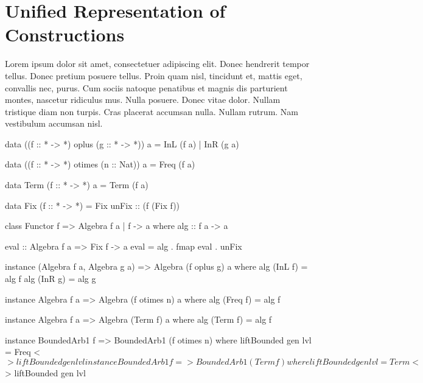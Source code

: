 \section{Unified Representation of Constructions}
\label{sec:representation}

Lorem ipsum dolor sit amet, consectetuer adipiscing elit. Donec hendrerit tempor
tellus. Donec pretium posuere tellus. Proin quam nisl, tincidunt et, mattis
eget, convallis nec, purus. Cum sociis natoque penatibus et magnis dis
parturient montes, nascetur ridiculus mus. Nulla posuere. Donec vitae dolor.
Nullam tristique diam non turpis. Cras placerat accumsan nulla. Nullam rutrum.
Nam vestibulum accumsan nisl.

\begin{code}
data ((f :: * -> *) oplus (g :: * -> *)) a = InL (f a) | InR (g a)
\end{code}
\begin{code}
data ((f :: * -> *) otimes (n :: Nat)) a = Freq (f a)
\end{code}
\begin{code}
data Term (f :: * -> *) a = Term (f a)
\end{code}

\begin{code}
  data Fix (f :: * -> *) = Fix { unFix :: (f (Fix f)) }
\end{code}

\begin{code}
class Functor f => Algebra f a | f -> a where
  alg :: f a -> a
\end{code}


\begin{code}
eval :: Algebra f a => Fix f -> a
eval = alg . fmap eval . unFix
\end{code}


\begin{code}
instance (Algebra f a, Algebra g a) => Algebra (f oplus g) a
  where  alg (InL f) = alg f
         alg (InR g) = alg g

instance Algebra f a => Algebra (f otimes n) a
  where alg (Freq f) = alg f

instance Algebra f a => Algebra (Term f) a
  where alg (Term f) = alg f
\end{code}


\begin{code}
instance BoundedArb1 f => BoundedArb1 (f otimes n) where
  liftBounded gen lvl = Freq <$> liftBounded gen lvl

instance BoundedArb1 f => BoundedArb1 (Term f) where
  liftBounded gen lvl = Term <$> liftBounded gen lvl
\end{code}


